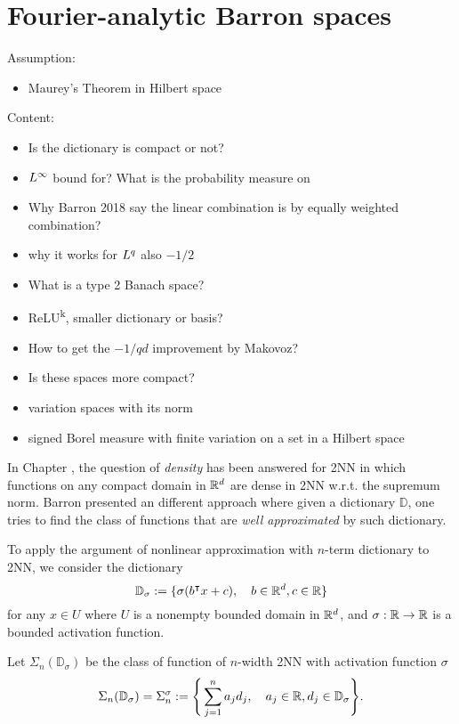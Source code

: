 \chapter{Fourier-analytic Barron spaces}
\label{sec:fourier}


Assumption:
\begin{itemize}
    \item Maurey's Theorem in Hilbert space
\end{itemize}

Content:
\begin{itemize}
    \item Is the dictionary is compact or not?
    \item $L^{\infty}$ bound for? What is the probability measure on
    \item Why Barron 2018 say the linear combination is by equally weighted
    combination?
    \item why it works for $L^{q}$ also $-1/2$
    \item What is a type 2 Banach space?
    \item ReLU\textsuperscript{k}, smaller dictionary or basis?
    \item How to get the $-1/q d$ improvement by Makovoz?
    \item Is these spaces more compact?
    \item variation spaces with its norm
    \item signed Borel measure with finite variation on a set in a Hilbert space
\end{itemize}

In Chapter \TODO, the question of \textit{density} has been answered for 2NN in
which functions on any compact domain in $\mathbb{R}^d$ are dense in 2NN w.r.t. the
supremum norm. Barron presented an different approach where given a dictionary
$\mathbb{D}$, one tries to find the class of functions that are \textit{well
approximated} by such dictionary.

To apply the argument of nonlinear approximation with $n$-term dictionary    to
2NN, we consider the dictionary
\begin{equation}
    \mathbb{D}_{\sigma} := \{
        \sigma(b{}^{\intercal} x + c), \quad b\in\mathbb{R}^d, c\in\mathbb{R}
    \}
\end{equation}
for any $x \in U$ where $U$ is a nonempty bounded domain in $\mathbb{R}^d$, and
$\sigma:\mathbb{R}\to\mathbb{R}$ is a bounded activation function.

Let $\Sigma_n(\mathbb{D}_{\sigma})$ be the class of function of $n$-width 2NN
with activation function $\sigma$
\begin{equation}
    \Sigma_n(\mathbb{D}_{\sigma}) = \Sigma_n^{\sigma}
    := \Bigg\{
        \sum_{j=1}^n a_j d_j, \quad a_j\in\mathbb{R}, d_j\in \mathbb{D}_{\sigma}
    \Bigg\}.
\end{equation}

